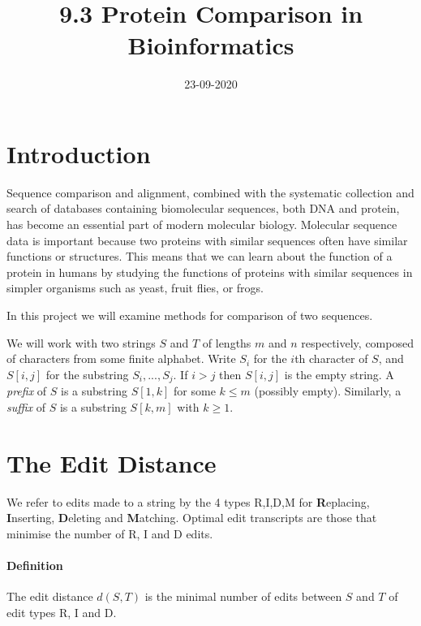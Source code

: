 \documentclass{article}
\title{9.3 Protein Comparison in Bioinformatics}
\date{23-09-2020}
\begin{document}
\maketitle

\section{Introduction}

Sequence  comparison  and  alignment,  combined  with  the  systematic  collection  and  search  of databases containing biomolecular sequences, both DNA and protein, has become an essential part of modern molecular biology.  Molecular sequence data is important because two proteins with similar sequences often have similar functions or structures.  This means that we can learn about the function of a protein in humans by studying the functions of proteins with similar sequences in simpler organisms such as yeast, fruit flies, or frogs. \par

In this project we will examine methods for comparison of two sequences. \par

We will work with two strings $S$ and $T$ of lengths $m$ and $n$ respectively, composed of characters from some finite alphabet. Write $S_i$ for the $i$th character of $S$, and $S[i,j]$ for the substring $S_i,...,S_j$. If $i>j$ then $S[i,j]$ is the empty string. A \textit{prefix} of $S$ is a substring $S[1,k]$ for some $k \leq m$ (possibly empty). Similarly, a \textit{suffix} of $S$ is a substring $S[k,m]$ with $k\geq 1$.

\newpage

\section{The Edit Distance}
\vspace{-0.3cm}
We refer to edits made to a string by the 4 types R,I,D,M for \textbf{R}eplacing, \textbf{I}nserting, \textbf{D}eleting and \textbf{M}atching. Optimal edit transcripts are those that minimise the number of R, I and D edits.
\vspace{-0.8cm}
\paragraph{Definition} 
The edit distance $d(S,T)$ is the minimal number of edits between $S$ and $T$ of edit types R, I and D.
\vspace{-0.8cm}
\end{document}
